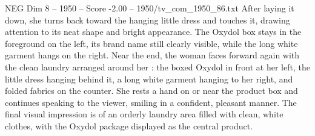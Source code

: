 \begin{textsample}{NEG Dim 8 – 1950 – Score -2.00 – 1950/tv\_com\_1950\_86.txt}
After laying it down, she turns back toward the hanging little dress and touches it, drawing attention to its neat shape and bright appearance.
The Oxydol box stays in the foreground on the left, its brand name still clearly visible, while the long white garment hangs on the right.
Near the end, the woman faces forward again with the clean laundry arranged around her : the boxed Oxydol in front at her left, the little dress hanging behind it, a long white garment hanging to her right, and folded fabrics on the counter.
She rests a hand on or near the product box and continues speaking to the viewer, smiling in a confident, pleasant manner.
The final visual impression is of an orderly laundry area filled with clean, white clothes, with the Oxydol package displayed as the central product.

\end{textsample}
